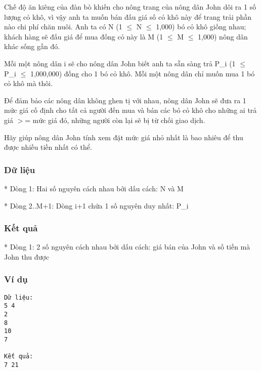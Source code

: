 



   Chế độ ăn kiêng của đàn bò khiến cho nông trang của nông dân John dôi ra 1 số lượng cỏ khô, vì vậy anh ta muốn bán đấu giá số cỏ khô này để trang trải phần nào chi phí chăn nuôi. Anh ta có N (1  $\le$  N  $\le$  1,000) bó cỏ khô giống nhau; khách hàng sẽ đấu giá để mua đống cỏ này là M (1  $\le$  M  $\le$  1,000) nông dân khác sống gần đó.  

   Mỗi một nông dân i sẽ cho nông dân John biết anh ta sẵn sàng trả P\_i (1  $\le$  P\_i  $\le$  1,000,000) đồng cho 1 bó cỏ khô. Mỗi một nông dân chỉ muốn mua 1 bó cỏ khô mà thôi.  

   Để đảm bảo các nông dân không ghen tị với nhau, nông dân John sẽ đưa ra 1 mức giá cố định cho tất cả người đến mua và bán các bó cỏ khô cho những ai trả giá $>$= mức giá đó, những người còn lại sẽ bị từ chối giao dịch.  

   Hãy giúp nông dân John tính xem đặt mức giá nhỏ nhất là bao nhiêu để thu được nhiều tiền nhất có thể.  

\subsubsection{   Dữ liệu  }

   * Dòng 1: Hai số nguyên cách nhau bởi dấu cách: N và M  

   * Dòng 2..M+1: Dòng i+1 chứa 1 số nguyên duy nhất: P\_i  

\subsubsection{   Kết quả  }

   * Dòng 1: 2 số nguyên cách nhau bởi dấu cách: giá bán của John và số tiền mà John thu được  

\subsubsection{   Ví dụ  }
\begin{verbatim}
Dữ liệu:
5 4
2
8
10
7

Kết quả:
7 21

\end{verbatim}

